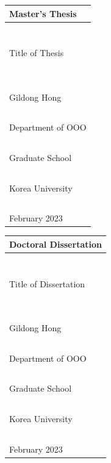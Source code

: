 \documentclass[11pt]{report}
\theoremstyle{plain}
\theoremstyle{definition}
\theoremstyle{corollary}
\theoremstyle{definition}
\theoremstyle{plain}
\theoremstyle{definition}
\theoremstyle{plain}
\begin{document}
\onehalfspacing
\renewcommand{\arraystretch}{1.5}

\newpage
\noindent
\begin{tabularx}{\textwidth}{| >{\centering\arraybackslash}X |}
\arrayrulecolor{gray}
\hline
\Large Master's Thesis \\\hline
~\small\color{gray}{3cm spacing}\vspace{70pt}\\\hline %
\huge Title of Thesis\par\vspace{98pt}
~\small\color{gray}{spacing can be adjusted}\vspace{14pt}\\\hline 
\Large Gildong Hong\\\hline
~\small\color{gray}{0.5cm spacing}\\\hline 
\Large Department of OOO \\\hline
~\small\color{gray}{1.5cm spacing}\vspace{28pt}\\\hline %
\LARGE Graduate School \\\hline
~\small\color{gray}{0.5cm spacing}\\\hline
\LARGE Korea University \\\hline
~\small\color{gray}{1cm spacing}\vspace{14pt}\\\hline %
\large February 2023 \\\hline
\end{tabularx}

\newpage
\noindent
\begin{tabularx}{\textwidth}{| >{\centering\arraybackslash}X |}
\arrayrulecolor{gray}
\hline
\Large Doctoral Dissertation \\\hline
~\small\color{gray}{3cm spacing}\vspace{70pt}\\\hline %
\huge Title of Dissertation\par\vspace{98pt}
~\small\color{gray}{spacing can be adjusted}\vspace{14pt}\\\hline
\Large Gildong Hong\\\hline
~\small\color{gray}{0.5cm spacing}\\\hline
\Large Department of OOO \\\hline
~\small\color{gray}{1.5cm spacing}\vspace{28pt}\\\hline %
\LARGE Graduate School \\\hline
~\small\color{gray}{0.5cm spacing}\\\hline
\LARGE Korea University \\\hline
~\small\color{gray}{1cm spacing}\vspace{14pt}\\\hline %
\large February 2023 \\\hline
\end{tabularx}
\end{document}
